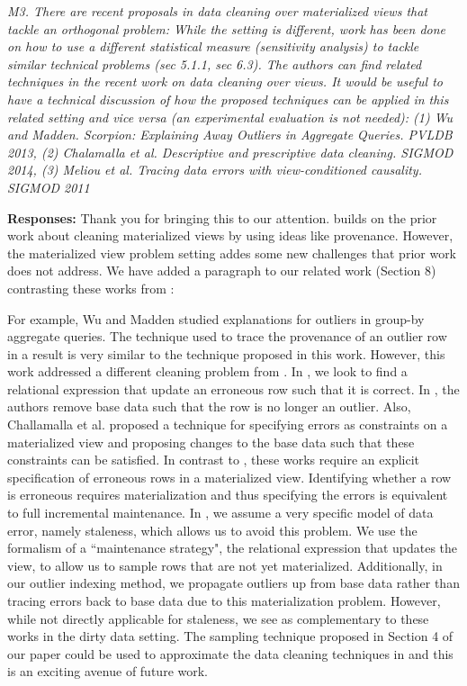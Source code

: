 \vspace{1em}
\emph{M3. There are recent proposals in data cleaning over materialized views that tackle an orthogonal problem: While the setting is different, work has been done on how to use a different statistical measure (sensitivity analysis) to tackle similar technical problems (sec 5.1.1, sec 6.3). The authors can find related techniques in the recent work on data cleaning over views. It would be useful to have a technical discussion of how the proposed techniques can be applied in this related setting and vice versa (an experimental evaluation is not needed): (1) Wu and Madden. Scorpion: Explaining Away Outliers in Aggregate Queries. PVLDB 2013, (2) Chalamalla et al. Descriptive and prescriptive data cleaning. SIGMOD 2014, (3) Meliou et al. Tracing data errors with view-conditioned causality. SIGMOD 2011}

\vspace{.25em}

{\bf Responses:} Thank you for bringing this to our attention.
\svc builds on the prior work about cleaning materialized views by using ideas like provenance.
However, the materialized view problem setting addes some new challenges that prior work does not address.
We have added a paragraph to our related work (Section 8) contrasting these works from \svc:
\begin{displayquote}For example, Wu and Madden \cite{DBLP:journals/pvldb/0002M13} studied explanations for outliers in group-by aggregate queries. The technique used to trace the provenance of an outlier row in a result is very similar to the technique proposed in this work. However, this work addressed a different cleaning problem from \svc. In \svc, we look to find a relational expression that update an erroneous row such that it is correct. In \cite{DBLP:journals/pvldb/0002M13}, the authors remove base data such that the row is no longer an outlier. Also, Challamalla et al. \cite{DBLP:conf/sigmod/ChalamallaIOP14} proposed a technique for specifying errors as constraints on a materialized view and proposing changes to the base data such that these constraints can be satisfied.
In contrast to \svc, these works require an explicit specification of erroneous rows in a materialized view.
Identifying whether a row is erroneous requires materialization and thus specifying the errors is equivalent to full incremental maintenance. 
In \svc, we assume a very specific model of data error, namely staleness, which allows us to avoid this problem.
We use the formalism of a ``maintenance strategy", the relational expression that updates the view, to allow us to sample rows that are not yet materialized.
Additionally, in our outlier indexing method, we propagate outliers up from base data rather than tracing errors back to base data due to this materialization problem.
However, while not directly applicable for staleness, we see \svc as complementary to these works in the dirty data setting. 
The sampling technique proposed in Section 4 of our paper could be used to approximate the data cleaning techniques in \cite{DBLP:journals/pvldb/0002M13, DBLP:journals/pvldb/0002M13, DBLP:conf/sigmod/ChalamallaIOP14} and this is an exciting avenue of future work. \end{displayquote}

